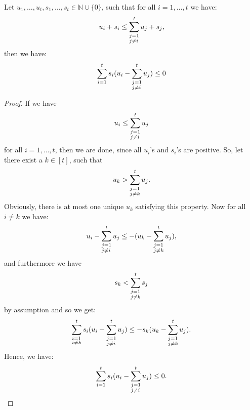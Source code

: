 \begin{lem}\label{lemma8}
Let \(u_1,\ldots,u_t,s_1,\ldots,s_t\in\mathbb{N}\cup\{0\}\), such that for all \(i=1,\ldots,t\) we have:
\[
u_i+s_i\leq\sum_{\begin{subarray}{l}j=1\\ j\neq i\end{subarray}}^tu_j+s_j,
\]
then we have:
\[
\sum\limits_{i=1}^ts_i(u_i-\sum_{\begin{subarray}{l}j=1\\ j\neq i\end{subarray}}^tu_j)\leq 0
\]
\begin{proof}
If we have
\[
u_i\leq\sum_{\begin{subarray}{l}j=1\\ j\neq i\end{subarray}}^tu_j
\]
for all \(i=1,\ldots,t\), then we are done, since all \(u_i\)'s and \(s_i\)'s are positive. So, let there exist a \(k\in[t]\), such that
\[
u_k>\sum_{\begin{subarray}{l}j=1\\ j\neq k\end{subarray}}^tu_j.
\]
Obviously, there is at most one unique \(u_k\) satisfying this property. Now for all \(i\neq k\) we have:
\[
u_i-\sum_{\begin{subarray}{l}j=1\\ j\neq i\end{subarray}}^tu_j\leq -(u_k-\sum_{\begin{subarray}{l}j=1\\ j\neq k\end{subarray}}^tu_j),
\]
and furthermore we have
\[
s_k<\sum_{\begin{subarray}{l}j=1\\ j\neq k\end{subarray}}^ts_j
\]
by assumption and so we get:
\[
\sum_{\begin{subarray}{l}i=1\\ i\neq k\end{subarray}}^ts_i(u_i-\sum_{\begin{subarray}{l}j=1\\ j\neq i\end{subarray}}^tu_j)\leq-s_k(u_k-\sum_{\begin{subarray}{l}j=1\\ j\neq k\end{subarray}}^tu_j).
\]
Hence, we have:
\[
\sum\limits_{i=1}^ts_i(u_i-\sum_{\begin{subarray}{l}j=1\\ j\neq i\end{subarray}}^tu_j)\leq 0.
\]
\end{proof}
\end{lem}
